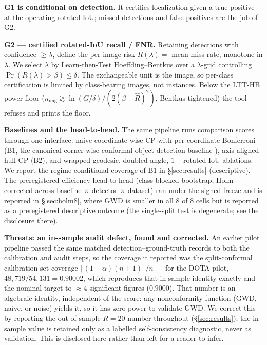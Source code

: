\documentclass[journal]{IEEEtran}
\begin{document}
\textbf{G1 is conditional on detection.} It certifies localization given a true positive at the
operating rotated-IoU; missed detections and false positives are the job of G2.

\textbf{G2 --- certified rotated-IoU recall / FNR.} Retaining detections with confidence $\ge\lambda$, define
the per-image risk $R(\lambda)=$ mean miss rate, monotone in $\lambda$. We select $\lambda$ by Learn-then-Test
Hoeffding--Bentkus over a $\lambda$-grid controlling $\Pr(R(\lambda)>\beta)\le\delta$. The exchangeable unit is
the image, so per-class certification is limited by class-bearing images, not instances. Below the
LTT-HB power floor ($n_{\mathrm{img}}\gtrsim\ln(G/\delta)/(2(\beta-\hat R)^2)$, Bentkus-tightened) the tool
refuses and prints the floor.

\textbf{Baselines and the head-to-head.} The same pipeline runs comparison scores through one interface: naive
coordinate-wise CP with per-coordinate Bonferroni (B1, the canonical corner-wise conformal
object-detection baseline \citep{degrancey2022}), axis-aligned-hull CP (B2), and wrapped-geodesic,
doubled-angle, $1-$rotated-IoU ablations. We report the regime-conditional coverage of B1 in
\S\ref{sec:results} (descriptive). The preregistered efficiency head-to-head (class-blocked bootstrap,
Holm-corrected across baseline $\times$ detector $\times$ dataset) ran under the signed freeze and is reported
in \S\ref{sec:holm8}, where GWD is smaller in all $8$ of $8$ cells but is reported as a preregistered
descriptive outcome (the single-split test is degenerate; see the disclosure there).

\textbf{Threats: an in-sample audit defect, found and corrected.} An earlier pilot pipeline
passed the same matched detection--ground-truth records to both the calibration and audit steps, so
the coverage it reported was the split-conformal calibration-set coverage
$\lceil(1-\alpha)(n+1)\rceil/n$ --- for the DOTA pilot, $48{,}719/54{,}131=0.90002$, which reproduces that
in-sample identity exactly and the nominal target to $\approx4$ significant figures ($0.9000$). That number is
an algebraic identity, independent of the score: any nonconformity
function (GWD, naive, or noise) yields it, so it has zero power to validate GWD. We correct this by
reporting the out-of-sample $R{=}20$ number throughout (\S\ref{sec:results}); the in-sample value is retained
only as a labelled self-consistency diagnostic, never as validation. This is disclosed here rather than left
for a reader to infer.
\end{document}
